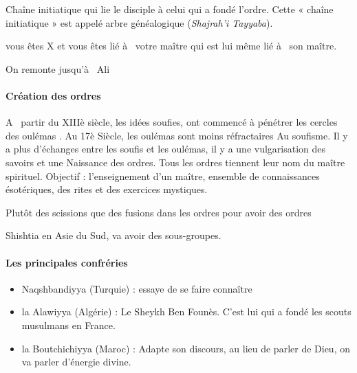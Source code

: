 \begin{Def}[silsila]
    Chaîne initiatique qui lie le disciple à celui qui a fondé l'ordre.
    Cette « chaîne initiatique »  est appelé arbre généalogique (\emph{Shajrah'i Tayyaba}).
\end{Def}
\begin{Ex}
    vous êtes 
X et vous êtes lié à  votre maître qui  est lui même lié à  
son maître.
 
On remonte jusqu'à  
Ali 
\end{Ex}



\paragraph{Création des ordres} A  partir du XIIIè  siècle, 
les idées soufies,  ont 
commencé 
à  pénétrer les 
cercles 
des oulémas . Au 17è 
Siècle, les oulémas 
sont moins réfractaires 
Au soufisme.  Il y a plus d'échanges entre les soufis et les oulémas, il y a une vulgarisation des savoirs et  une 
Naissance des ordres. Tous les ordres tiennent leur nom du maître spirituel. Objectif :  l'enseignement d'un maître,  ensemble 
de connaissances ésotériques, des rites et des exercices mystiques.


 
Plutôt des scissions que des fusions dans les ordres pour avoir des ordres     
\begin{Ex}
Shishtia en Asie du Sud, va avoir des sous-groupes.     
\end{Ex}


\paragraph{Les principales confréries}

\begin{itemize}
    \item Naqshbandiyya (Turquie) : essaye de se faire connaître
    \item la Alawiyya (Algérie) : Le Sheykh Ben Founès. C'est lui qui a fondé les scouts musulmans en France. 
    \item la Boutchichiyya (Maroc) :   Adapte son discours, au lieu de parler de Dieu, on va parler d'énergie divine.
\end{itemize}
